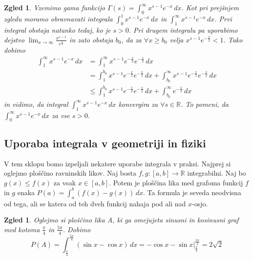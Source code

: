 \documentclass[10pt, a4paper]{article}
\newtheorem{zgled}[izr]{Zgled}
\newcommand{\R}{\mathbb {R}}
\newcommand{\limf}[3]{\lim_{#1 \to #2} {#3}}
\begin{document}
\begin{zgled}
    Vzemimo gama funkcijo $\Gamma(s) = \int_0 ^\infty x^{s-1} e^{-x}\,dx$.
    Kot pri prejšnjem zgledu moramo obravnavati integrala $\int_0 ^1 x^{s-1} e^{-x}\,dx$ in $\int_1 ^\infty x^{s-1} e^{-x}\,dx$.
    Prvi integral obstaja natanko tedaj, ko je $s > 0$.
    Pri drugem integralu pa uporabimo dejstvo $\limf{x}{\infty}{\frac{x^{s-1}}{e^{\frac{x}{2}}}}$ in zato obstaja $b_0$, da za $\forall x \geq b_0$ velja $x^{s-1} e^{-\frac{x}{2}} < 1$.
    Tako dobimo
    \begin{align*}
        \int_1 ^\infty x^{s-1} e^{-x}\,dx &= \int_1 ^\infty x^{s-1} e^{-\frac{x}{2}} e^{-\frac{x}{2}}\,dx\\
        &= \int_1 ^{b_0} x^{s-1} e^{-\frac{x}{2}} e^{-\frac{x}{2}}\,dx
        + \int_{b_0} ^\infty x^{s-1} e^{-\frac{x}{2}} e^{-\frac{x}{2}}\,dx\\
        &\leq \int_1 ^{b_0} x^{s-1} e^{-\frac{x}{2}} e^{-\frac{x}{2}}\,dx
        + \int_{b_0} ^\infty e^{-\frac{x}{2}}\,dx
    \end{align*} 
    in vidimo, da integral $\int_1 ^\infty x^{s-1} e^{-x}\,dx$ konvergira za $\forall s \in \R$.
    To pomeni, da $\int_0 ^\infty x^{s-1} e^{-x}\,dx$ za vse $s > 0$.
\end{zgled}

\subsection{Uporaba integrala v geometriji in fiziki}

V tem sklopu bomo izpeljali nekatere uporabe integrala v praksi.
Najprej si oglejmo ploščino ravninskih likov. 
Naj bosta $f, g: [a, b] \rightarrow \R$ integrabilni.
Naj bo $g(x) \leq f(x)$ za vsak $x \in [a, b]$.
Potem je ploščina lika med grafoma funkcij $f$ in $g$ enaka $P(a) = \int_a ^b (f(x) - g(x))\,dx$.
Ta formula je seveda neodvisna od tega, ali se katera od teh dveh funkcij nahaja pod ali nad $x$-osjo.

\begin{zgled}
    \label{zgl:10}
    Oglejmo si ploščino lika A, ki ga omejujeta sinusni in kosinusni graf med kotoma $\frac{\pi}{4}$ in $\frac{5 \pi}{4}$.
    Dobimo $$P(A) = \int_{\frac{\pi}{4}} ^{\frac{5 \pi}{4}} (\sin x - \cos x)\,dx = - \cos x - \sin x \Big|_{\frac{\pi}{4}} ^{\frac{5 \pi}{4}} = 2 \sqrt{2}$$
\end{zgled}
\end{document}
